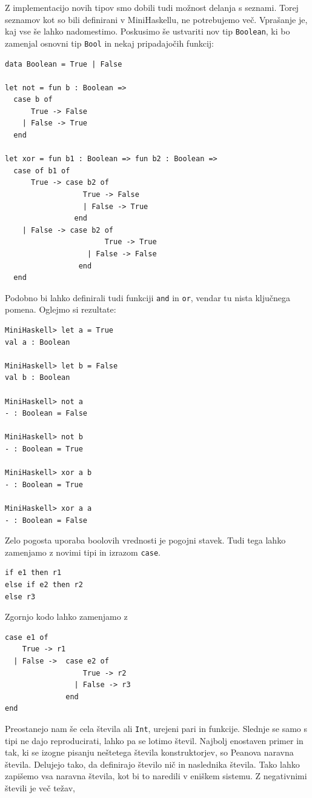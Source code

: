 \documentclass[a4paper,12pt,openright]{book}
\begin{document}
Z implementacijo novih tipov smo dobili tudi možnost delanja s seznami. Torej seznamov kot so bili definirani v MiniHaskellu, ne potrebujemo več. Vprašanje je, kaj vse še lahko nadomestimo.
Poskusimo še ustvariti nov tip \lstinline{Boolean}, ki bo zamenjal osnovni tip \lstinline{Bool} in nekaj pripadajočih funkcij:
\begin{lstlisting}
data Boolean = True | False
	
let not = fun b : Boolean => 
  case b of 
      True -> False 
    | False -> True 
  end

let xor = fun b1 : Boolean => fun b2 : Boolean =>
  case of b1 of
      True -> case b2 of
                  True -> False
	              | False -> True
	            end
    | False -> case b2 of
		               True -> True
	               | False -> False
	             end
  end
\end{lstlisting}
Podobno bi lahko definirali tudi funkciji \lstinline{and} in \lstinline{or}, vendar tu nista ključnega pomena. Oglejmo si rezultate:
\begin{lstlisting}
MiniHaskell> let a = True
val a : Boolean

MiniHaskell> let b = False
val b : Boolean

MiniHaskell> not a
- : Boolean = False

MiniHaskell> not b
- : Boolean = True

MiniHaskell> xor a b
- : Boolean = True

MiniHaskell> xor a a
- : Boolean = False
\end{lstlisting}
Zelo pogosta uporaba boolovih vrednosti je pogojni stavek. Tudi tega lahko zamenjamo z novimi tipi in izrazom \lstinline{case}.
\begin{lstlisting}
if e1 then r1
else if e2 then r2
else r3
\end{lstlisting}
Zgornjo kodo lahko zamenjamo z
\begin{lstlisting}
case e1 of
    True -> r1
  | False ->  case e2 of
                  True -> r2
                | False -> r3
              end
end
\end{lstlisting}
Preostanejo nam še cela števila ali \lstinline{Int}, urejeni pari in funkcije. Slednje se samo s tipi ne dajo reproducirati, lahko pa se lotimo števil. Najbolj enostaven primer in tak, ki se izogne pisanju neštetega števila 
konstruktorjev, so Peanova naravna števila. Delujejo tako, da definirajo število nič in naslednika števila. Tako lahko zapišemo vsa naravna števila, kot bi to naredili v eniškem sistemu. Z negativnimi števili je več težav, 
\end{document}
